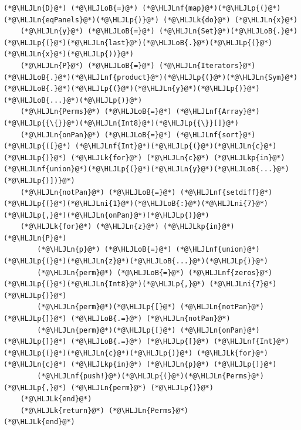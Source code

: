 \documentclass[12pt,a4paper]{article}
\newcommand{\HLJLk}[1]{\textcolor[RGB]{148,91,176}{\textbf{#1}}}
\newcommand{\HLJLkp}[1]{\textcolor[RGB]{148,91,176}{\textbf{#1}}}
\newcommand{\HLJLn}[1]{#1}
\newcommand{\HLJLnf}[1]{\textcolor[RGB]{66,102,213}{#1}}
\newcommand{\HLJLni}[1]{\textcolor[RGB]{59,151,46}{#1}}
\newcommand{\HLJLoB}[1]{\textcolor[RGB]{102,102,102}{\textbf{#1}}}
\newcommand{\HLJLp}[1]{#1}
\begin{document}
\begin{lstlisting}
(*@\HLJLn{D}@*) (*@\HLJLoB{=}@*) (*@\HLJLnf{map}@*)(*@\HLJLp{(}@*)(*@\HLJLn{eqPanels}@*)(*@\HLJLp{)}@*) (*@\HLJLk{do}@*) (*@\HLJLn{x}@*)
	(*@\HLJLn{y}@*) (*@\HLJLoB{=}@*) (*@\HLJLn{Set}@*)(*@\HLJLoB{.}@*)(*@\HLJLp{(}@*)(*@\HLJLn{last}@*)(*@\HLJLoB{.}@*)(*@\HLJLp{(}@*)(*@\HLJLn{x}@*)(*@\HLJLp{))}@*)
	(*@\HLJLn{P}@*) (*@\HLJLoB{=}@*) (*@\HLJLn{Iterators}@*)(*@\HLJLoB{.}@*)(*@\HLJLnf{product}@*)(*@\HLJLp{(}@*)(*@\HLJLn{Sym}@*)(*@\HLJLoB{.}@*)(*@\HLJLp{(}@*)(*@\HLJLn{y}@*)(*@\HLJLp{)}@*)(*@\HLJLoB{...}@*)(*@\HLJLp{)}@*)
	(*@\HLJLn{Perms}@*) (*@\HLJLoB{=}@*) (*@\HLJLnf{Array}@*)(*@\HLJLp{{\{}}@*)(*@\HLJLn{Int8}@*)(*@\HLJLp{{\}}[]}@*)
	(*@\HLJLn{onPan}@*) (*@\HLJLoB{=}@*) (*@\HLJLnf{sort}@*)(*@\HLJLp{([}@*) (*@\HLJLnf{Int}@*)(*@\HLJLp{(}@*)(*@\HLJLn{c}@*)(*@\HLJLp{)}@*) (*@\HLJLk{for}@*) (*@\HLJLn{c}@*) (*@\HLJLkp{in}@*) (*@\HLJLnf{union}@*)(*@\HLJLp{(}@*)(*@\HLJLn{y}@*)(*@\HLJLoB{...}@*)(*@\HLJLp{)])}@*)
	(*@\HLJLn{notPan}@*) (*@\HLJLoB{=}@*) (*@\HLJLnf{setdiff}@*)(*@\HLJLp{(}@*)(*@\HLJLni{1}@*)(*@\HLJLoB{:}@*)(*@\HLJLni{7}@*)(*@\HLJLp{,}@*)(*@\HLJLn{onPan}@*)(*@\HLJLp{)}@*)
	(*@\HLJLk{for}@*) (*@\HLJLn{z}@*) (*@\HLJLkp{in}@*) (*@\HLJLn{P}@*)
		(*@\HLJLn{p}@*) (*@\HLJLoB{=}@*) (*@\HLJLnf{union}@*)(*@\HLJLp{(}@*)(*@\HLJLn{z}@*)(*@\HLJLoB{...}@*)(*@\HLJLp{)}@*)
		(*@\HLJLn{perm}@*) (*@\HLJLoB{=}@*) (*@\HLJLnf{zeros}@*)(*@\HLJLp{(}@*)(*@\HLJLn{Int8}@*)(*@\HLJLp{,}@*) (*@\HLJLni{7}@*)(*@\HLJLp{)}@*)
		(*@\HLJLn{perm}@*)(*@\HLJLp{[}@*) (*@\HLJLn{notPan}@*)(*@\HLJLp{]}@*) (*@\HLJLoB{.=}@*) (*@\HLJLn{notPan}@*)
		(*@\HLJLn{perm}@*)(*@\HLJLp{[}@*) (*@\HLJLn{onPan}@*) (*@\HLJLp{]}@*) (*@\HLJLoB{.=}@*) (*@\HLJLp{[}@*) (*@\HLJLnf{Int}@*)(*@\HLJLp{(}@*)(*@\HLJLn{c}@*)(*@\HLJLp{)}@*) (*@\HLJLk{for}@*) (*@\HLJLn{c}@*) (*@\HLJLkp{in}@*) (*@\HLJLn{p}@*) (*@\HLJLp{]}@*)
		(*@\HLJLnf{push!}@*)(*@\HLJLp{(}@*)(*@\HLJLn{Perms}@*)(*@\HLJLp{,}@*) (*@\HLJLn{perm}@*) (*@\HLJLp{)}@*)
	(*@\HLJLk{end}@*)
	(*@\HLJLk{return}@*) (*@\HLJLn{Perms}@*)
(*@\HLJLk{end}@*)


\end{lstlisting}
\end{document}
